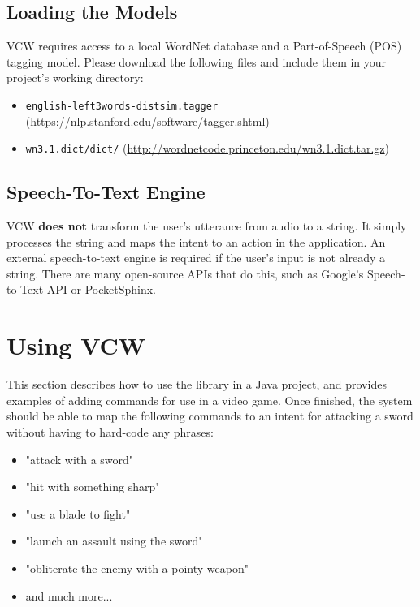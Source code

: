 \documentclass{article}
\begin{document}
\subsection{Loading the Models}

VCW requires access to a local WordNet database and a Part-of-Speech (POS) tagging model. Please download the following files and include them in your project's working directory:

\begin{itemize}
\item \texttt{english-left3words-distsim.tagger} (\url{https://nlp.stanford.edu/software/tagger.shtml})
\item \texttt{wn3.1.dict/dict/} (\url{http://wordnetcode.princeton.edu/wn3.1.dict.tar.gz})
\end{itemize}

\subsection{Speech-To-Text Engine}

VCW \textbf{does not} transform the user's utterance from audio to a string. It simply processes the string and maps the intent to an action in the application. An external speech-to-text engine is required if the user's input is not already a string. There are many open-source APIs that do this, such as Google's Speech-to-Text API or PocketSphinx.

\section{Using VCW}
This section describes how to use the library in a Java project, and provides examples of adding commands for use in a video game. Once finished, the system should be able to map the following commands to an intent for attacking a sword without having to hard-code any phrases:

\begin{itemize}
\item "attack with a sword"
\item "hit with something sharp"
\item "use a blade to fight"
\item "launch an assault using the sword"
\item "obliterate the enemy with a pointy weapon"
\item and much more...
\end{itemize}
\end{document}

